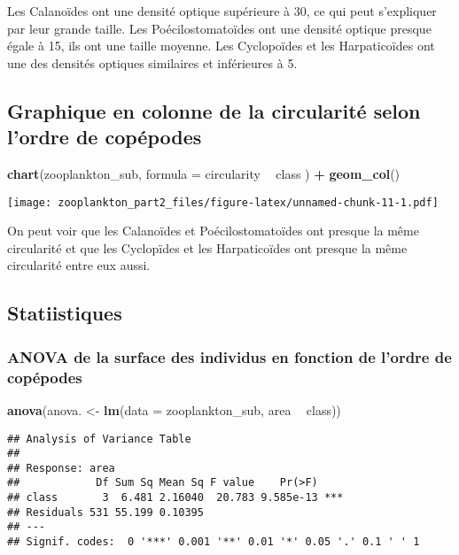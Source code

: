 \documentclass[]{article}
\newenvironment{Shaded}{\begin{snugshade}}{\end{snugshade}}
\newcommand{\KeywordTok}[1]{\textcolor[rgb]{0.13,0.29,0.53}{\textbf{#1}}}
\newcommand{\DataTypeTok}[1]{\textcolor[rgb]{0.13,0.29,0.53}{#1}}
\newcommand{\StringTok}[1]{\textcolor[rgb]{0.31,0.60,0.02}{#1}}
\newcommand{\OperatorTok}[1]{\textcolor[rgb]{0.81,0.36,0.00}{\textbf{#1}}}
\newcommand{\NormalTok}[1]{#1}
\begin{document}
Les Calanoïdes ont une densité optique supérieure à 30, ce qui peut
s'expliquer par leur grande taille. Les Poécilostomatoïdes ont une
densité optique presque égale à 15, ils ont une taille moyenne. Les
Cyclopoïdes et les Harpaticoïdes ont une des densités optiques
similaires et inférieures à 5.

\subsection{Graphique en colonne de la circularité selon l'ordre de
copépodes}\label{graphique-en-colonne-de-la-circularite-selon-lordre-de-copepodes}

\begin{Shaded}
\begin{Highlighting}[]
\KeywordTok{chart}\NormalTok{(zooplankton_sub, }\DataTypeTok{formula =}\NormalTok{  circularity }\OperatorTok{~}\StringTok{ }\NormalTok{class ) }\OperatorTok{+}\StringTok{ }
\StringTok{  }\KeywordTok{geom_col}\NormalTok{()}
\end{Highlighting}
\end{Shaded}

\texttt{[image: zooplankton\_part2\_files/figure-latex/unnamed-chunk-11-1.pdf]}

On peut voir que les Calanoïdes et Poécilostomatoïdes ont presque la
même circularité et que les Cyclopïdes et les Harpaticoïdes ont presque
la même circularité entre eux aussi.

\subsection{Statiistiques}\label{statiistiques}

\subsubsection{ANOVA de la surface des individus en fonction de l'ordre
de
copépodes}\label{anova-de-la-surface-des-individus-en-fonction-de-lordre-de-copepodes}

\begin{Shaded}
\begin{Highlighting}[]
\KeywordTok{anova}\NormalTok{(anova. <-}\StringTok{ }\KeywordTok{lm}\NormalTok{(}\DataTypeTok{data =}\NormalTok{ zooplankton_sub, area }\OperatorTok{~}\StringTok{ }\NormalTok{class))}
\end{Highlighting}
\end{Shaded}

\begin{verbatim}
## Analysis of Variance Table
## 
## Response: area
##            Df Sum Sq Mean Sq F value    Pr(>F)    
## class       3  6.481 2.16040  20.783 9.585e-13 ***
## Residuals 531 55.199 0.10395                      
## ---
## Signif. codes:  0 '***' 0.001 '**' 0.01 '*' 0.05 '.' 0.1 ' ' 1
\end{verbatim}
\end{document}
